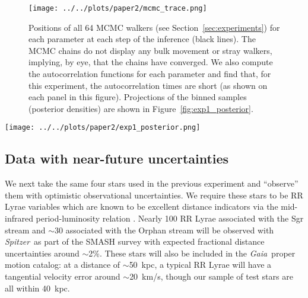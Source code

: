\documentclass{emulateapj}
\newcommand{\project}[1]{\textsl{#1}}
\newcommand{\gaia}{\project{Gaia}}
\newcommand{\spitzer}{\project{Spitzer}~}
\newcommand{\vhalo}{v_{\rm h}}
\newcommand{\potp}{$q_1,q_z,\phi,\vhalo$}
\begin{document}
\begin{figure}[!h]
\begin{center}
\texttt{[image: ../../plots/paper2/mcmc\_trace.png]}
\caption{ Positions of all 64 MCMC walkers (see Section~\ref{sec:experiments}) for each parameter at each step of the inference (black lines). The MCMC chains do not display any bulk movement or stray walkers, implying, by eye, that the chains have converged. We also compute the autocorrelation functions for each parameter and find that, for this experiment, the autocorrelation times are short (as shown on each panel in this figure). Projections of the binned samples (posterior densities) are shown in Figure~\ref{fig:exp1_posterior}. }\label{fig:trace}
\end{center}
\end{figure}

\begin{figure*}[!h]
\begin{center}
\texttt{[image: ../../plots/paper2/exp1\_posterior.png]}
\caption{ Projections of the posterior probability distribution over the four potential parameters (\potp) and Lagrange point offset ($\alpha$) assuming negligible uncertainties on the observed phase-space coordinates of eight stars and the progenitor, visualized as two-dimensional histograms of MCMC samples. Solid contours (black lines) show approximately 1$\sigma$ and 2$\sigma$ levels of the distribution. Vertical and horizontal lines (blue) show the true, input values for the potential parameters used in the N-body simulations. For the potential parameters, the axis ranges are chosen to be the same for this and the potential posterior plots to follow. }\label{fig:exp1_posterior}
\end{center}
\end{figure*}

\subsection{Data with near-future uncertainties}\label{sec:exp2}
We next take the same four stars used in the previous experiment and ``observe'' them with optimistic observational uncertainties. We require these stars to be RR Lyrae variables which are known to be excellent distance indicators via the mid-infrared period-luminosity relation \citep[as shown in, e.g.,][]{madore12}. Nearly 100 RR Lyrae associated with the Sgr stream and $\sim$30 associated with the Orphan stream will be observed with \spitzer as part of the SMASH survey \citep{smashprop} with expected fractional distance uncertainties around $\sim$2\%. These stars will also be included in the \gaia\, proper motion catalog: at a distance of $\sim$50~kpc, a typical RR Lyrae will have a tangential velocity error around $\sim$20~km/s, though our sample of test stars are all within 40~kpc.
\end{document}
